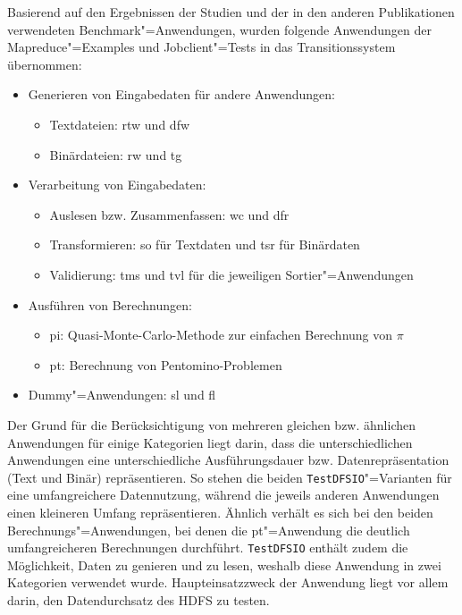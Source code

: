 Basierend auf den Ergebnissen der Studien und der in den anderen Publikationen verwendeten Benchmark"=Anwendungen, wurden folgende Anwendungen der Mapreduce"=Examples und Jobclient"=Tests in das Transitionssystem übernommen:

\begin{itemize}
    \item Generieren von Eingabedaten für andere Anwendungen:
    \begin{itemize}
        \item Textdateien: \ac{rtw} und \ac{dfw}
        \item Binärdateien: \ac{rw} und \ac{tg}
    \end{itemize}

    \item Verarbeitung von Eingabedaten:
    \begin{itemize}
        \item Auslesen bzw. Zusammenfassen: \ac{wc} und \ac{dfr}
        \item Transformieren: \ac{so} für Textdaten und \ac{tsr} für Binärdaten
        \item Validierung: \ac{tms} und \ac{tvl} für die jeweiligen Sortier"=Anwendungen
    \end{itemize}

    \item Ausführen von Berechnungen:
    \begin{itemize}
        \item \acl{pi}: Quasi-Monte-Carlo-Methode zur einfachen Berechnung von $\pi$ 
        \item \ac{pt}: Berechnung von Pentomino-Problemen
    \end{itemize}

    \item Dummy"=Anwendungen: \ac{sl} und \ac{fl}
\end{itemize}

Der Grund für die Berücksichtigung von mehreren gleichen bzw. ähnlichen Anwendungen für einige Kategorien liegt darin, dass die unterschiedlichen Anwendungen eine unterschiedliche Ausführungsdauer bzw. Datenrepräsentation (Text und Binär) repräsentieren.
So stehen die beiden \texttt{TestDFSIO}"=Varianten für eine umfangreichere Datennutzung, während die jeweils anderen Anwendungen einen kleineren Umfang repräsentieren.
Ähnlich verhält es sich bei den beiden Berechnungs"=Anwendungen, bei denen die \acl{pt}"=Anwendung die deutlich umfangreicheren Berechnungen durchführt.
\texttt{TestDFSIO} enthält zudem die Möglichkeit, Daten zu genieren und zu lesen, weshalb diese Anwendung in zwei Kategorien verwendet wurde.
Haupteinsatzzweck der Anwendung liegt vor allem darin, den Datendurchsatz des \ac{HDFS} zu testen.

